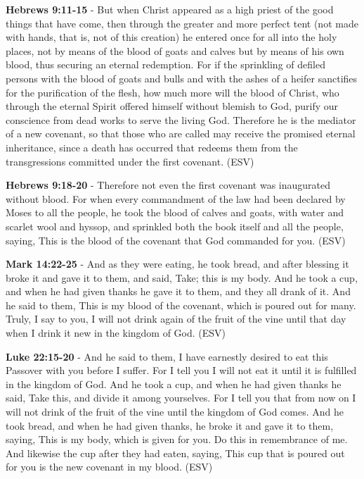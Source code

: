 \documentclass[11pt]{article}
\begin{document}
\textbf{Hebrews 9:11-15} - But when Christ appeared as a high priest of the good things that have come, then through the greater and more perfect tent (not made with hands, that is, not of this creation) he entered once for all into the holy places, not by means of the blood of goats and calves but by means of his own blood, thus securing an eternal redemption. For if the sprinkling of defiled persons with the blood of goats and bulls and with the ashes of a heifer sanctifies for the purification of the flesh, how much more will the blood of Christ, who through the eternal Spirit offered himself without blemish to God, purify our conscience from dead works to serve the living God. Therefore he is the mediator of a new covenant, so that those who are called may receive the promised eternal inheritance, since a death has occurred that redeems them from the transgressions committed under the first covenant. (ESV)

\textbf{Hebrews 9:18-20} - Therefore not even the first covenant was inaugurated without blood. For when every commandment of the law had been declared by Moses to all the people, he took the blood of calves and goats, with water and scarlet wool and hyssop, and sprinkled both the book itself and all the people, saying, This is the blood of the covenant that God commanded for you. (ESV)

\textbf{Mark 14:22-25} - And as they were eating, he took bread, and after blessing it broke it and gave it to them, and said, Take; this is my body. And he took a cup, and when he had given thanks he gave it to them, and they all drank of it. And he said to them, This is my blood of the covenant, which is poured out for many. Truly, I say to you, I will not drink again of the fruit of the vine until that day when I drink it new in the kingdom of God. (ESV)

\textbf{Luke 22:15-20} - And he said to them, I have earnestly desired to eat this Passover with you before I suffer. For I tell you I will not eat it until it is fulfilled in the kingdom of God. And he took a cup, and when he had given thanks he said, Take this, and divide it among yourselves. For I tell you that from now on I will not drink of the fruit of the vine until the kingdom of God comes. And he took bread, and when he had given thanks, he broke it and gave it to them, saying, This is my body, which is given for you. Do this in remembrance of me. And likewise the cup after they had eaten, saying, This cup that is poured out for you is the new covenant in my blood. (ESV)
\end{document}
